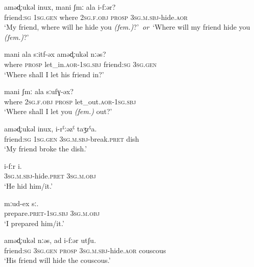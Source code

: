 \documentclass[14pt]{extarticle}
\newcommand{\SG}{\textsc{sg}}
\newcommand{\M}{\textsc{m}}
\newcommand{\F}{\textsc{f}}
\newcommand{\PROSP}{\textsc{prosp}}
\newcommand{\SBJ}{\textsc{sbj}}
\newcommand{\OBJ}{\textsc{obj}}
\newcommand{\GEN}{\textsc{gen}}
\newcommand{\AOR}{\textsc{aor}}
\newcommand{\PRET}{\textsc{pret}}
\begin{document}
\begin{exe}
\ex
\gll aməd̥ːukəl inux, mani ʃmː ala i-fːər?\\
friend:{\SG} 1{\SG}.{\GEN} where 2{\SG}.{\F}.{\OBJ} {\PROSP} 3{\SG}.{\M}.{\SBJ}-hide.{\AOR}\\
\glt `My friend, where will he hide you \textit{\textit{(fem.)}}?'\ \textit{or}\ `Where will my friend hide you \textit{\textit{(fem.)}}?'

\ex
\gll mani ala sːitf-əx aməd̥ːukəl nːəs?\\
where {\PROSP} let\_in.{\AOR}-1{\SG}.{\SBJ} friend:{\SG} 3{\SG}.{\GEN}\\
\glt `Where shall I let his friend in?'

\ex
\gll mani ʃmː ala sːufɣ-əx?\\
where 2{\SG}.{\F}.{\OBJ} {\PROSP} let\_out.{\AOR}-1{\SG}.{\SBJ}\\
\glt `Where shall I let you \textit{(fem.)} out?'

\ex
\gll aməd̥ːukəl inux, i-rˁːəzˁ taʒrˁa.\\
friend:{\SG} 1{\SG}.{\GEN} 3{\SG}.{\M}.{\SBJ}-break.{\PRET} dish\\
\glt `My friend broke the dish.'

\ex
\gll i-fːr i.\\
3{\SG}.{\M}.{\SBJ}-hide.{\PRET} 3{\SG}.{\M}.{\OBJ}\\
\glt `He hid him/it.'

\ex
\gll mːud-ex sː.\\
prepare.{\PRET}-1{\SG}.{\SBJ} 3{\SG}.{\M}.{\OBJ}\\
\glt `I prepared him/it.'

\ex
\gll aməd̥ːukəl nːəs, ad i-fːər utʃu.\\
friend:{\SG} 3{\SG}.{\GEN} {\PROSP} 3{\SG}.{\M}.{\SBJ}-hide.{\AOR} couscous\\
\glt `His friend will hide the couscous.'
\end{exe}
\end{document}
